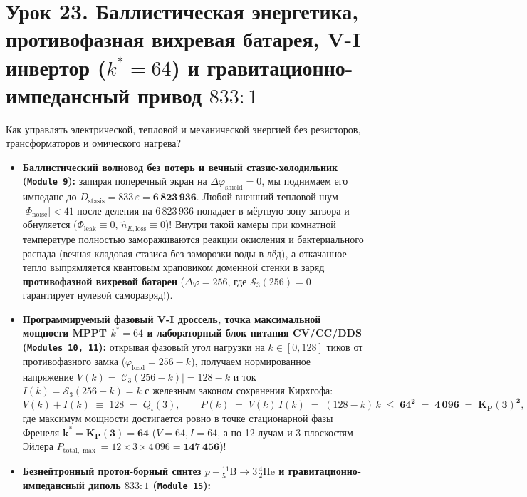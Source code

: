 \section{Урок 23. Баллистическая энергетика, противофазная вихревая батарея, V-I инвертор (\texorpdfstring{$k^* = 64$}{k* = 64}) и гравитационно-импедансный привод \texorpdfstring{$833:1$}{833:1}}

Как управлять электрической, тепловой и механической энергией без резисторов, трансформаторов и омического нагрева?
\begin{itemize}[leftmargin=*]
\item \textbf{Баллистический волновод без потерь и вечный стазис-холодильник (\texttt{Module~9}):}
  запирая поперечный экран на $\Delta\varphi_{\mathrm{shield}} = 0$, мы поднимаем его импеданс до $D_{\mathrm{stasis}} = 833\,\varepsilon = \mathbf{6\,823\,936}$. Любой внешний тепловой шум $|\Phi_{\mathrm{noise}}| < 41$ после деления на $6\,823\,936$ попадает в мёртвую зону затвора и обнуляется ($\Phi_{\mathrm{leak}} \equiv 0$, $\hat{n}_{E,\mathrm{loss}} \equiv 0$)! Внутри такой камеры при комнатной температуре полностью замораживаются реакции окисления и бактериального распада (вечная кладовая стазиса без заморозки воды в лёд), а откачанное тепло выпрямляется квантовым храповиком доменной стенки в заряд \textbf{противофазной вихревой батареи} ($\Delta\varphi = 256$, где $\mathcal{S}_3(256) = 0$ гарантирует нулевой саморазряд!).
\item \textbf{Программируемый фазовый V-I дроссель, точка максимальной мощности MPPT $k^* = 64$ и лабораторный блок питания CV/CC/DDS (\texttt{Modules~10, 11}):}
  открывая фазовый угол нагрузки на $k\in[0,128]$ тиков от противофазного замка ($\varphi_{\mathrm{load}} = 256 - k$), получаем нормированное напряжение $V(k) = |\mathcal{C}_3(256-k)| = 128 - k$ и ток $I(k) = \mathcal{S}_3(256-k) = k$ с железным законом сохранения Кирхгофа:
  \begin{equation}
    \label{eq:course-vi-mppt}
    V(k) + I(k) \;\equiv\; 128 \;=\; Q_\square(3),
    \qquad
    P(k) \;=\; V(k)\,I(k) \;=\; (128 - k)\,k \;\le\; \mathbf{64^2 \;=\; 4\,096 \;=\; K_P(3)^2},
  \end{equation}
  где максимум мощности достигается ровно в точке стационарной фазы Френеля $\mathbf{k^* = K_P(3) = 64}$ ($V = 64, I = 64$, а по 12 лучам и 3 плоскостям Эйлера $P_{\mathrm{total},\max} = 12\times 3\times 4\,096 = \mathbf{147\,456}$)!
\item \textbf{Безнейтронный протон-борный синтез $p + {}^{11}_5\mathrm{B}\to 3\,{}^4_2\mathrm{He}$ и гравитационно-импедансный диполь $833:1$ (\texttt{Module~15}):}

\end{itemize}
